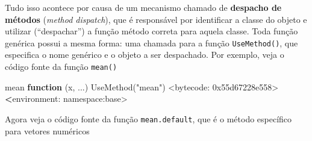 \documentclass[
  10pt,
  a4paper]{book}
\newenvironment{Shaded}{\begin{snugshade}}{\end{snugshade}}
\newcommand{\ControlFlowTok}[1]{\textcolor[rgb]{0.13,0.29,0.53}{\textbf{#1}}}
\newcommand{\DecValTok}[1]{\textcolor[rgb]{0.00,0.00,0.81}{#1}}
\newcommand{\ErrorTok}[1]{\textcolor[rgb]{0.64,0.00,0.00}{\textbf{#1}}}
\newcommand{\FunctionTok}[1]{\textcolor[rgb]{0.00,0.00,0.00}{#1}}
\newcommand{\NormalTok}[1]{#1}
\newcommand{\SpecialCharTok}[1]{\textcolor[rgb]{0.00,0.00,0.00}{#1}}
\newcommand{\StringTok}[1]{\textcolor[rgb]{0.31,0.60,0.02}{#1}}
\begin{document}
Tudo isso acontece por causa de um mecanismo chamado de \textbf{despacho de
métodos} (\emph{method dispatch}), que é responsável por identificar a
classe do objeto e utilizar (``despachar'') a função método correta para
aquela classe. Toda função genérica possui a mesma forma: uma chamada
para a função \texttt{UseMethod()}, que especifica o nome genérico e o objeto a
ser despachado. Por exemplo, veja o código fonte da função \texttt{mean()}

\begin{Shaded}
\begin{Highlighting}[]
\NormalTok{mean}
\ControlFlowTok{function}\NormalTok{ (x, ...) }
\FunctionTok{UseMethod}\NormalTok{(}\StringTok{"mean"}\NormalTok{)}
\SpecialCharTok{\textless{}}\NormalTok{bytecode}\SpecialCharTok{:} \DecValTok{0x55d67228e558}\SpecialCharTok{\textgreater{}}
\ErrorTok{\textless{}}\NormalTok{environment}\SpecialCharTok{:}\NormalTok{ namespace}\SpecialCharTok{:}\NormalTok{base}\SpecialCharTok{\textgreater{}}
\end{Highlighting}
\end{Shaded}

Agora veja o código fonte da função \texttt{mean.default}, que é o método
específico para vetores numéricos
\end{document}

